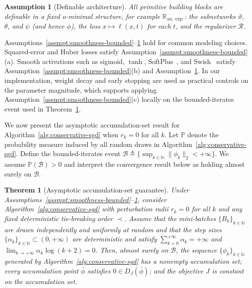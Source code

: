 \documentclass[11pt, letterpaper, oneside, reqno]{amsart}
\newcommand{\Let}{\triangleq}
\newtheorem{theorem}{Theorem}
\newtheorem{assumption}{Assumption}
\begin{document}
\begin{assumption}[Definable architecture]
\label{assmpt:definable}
All primitive building blocks are definable in a fixed o-minimal structure, for example $\mathbb R_{\mathrm{an},\exp}$: the subnetworks $\vartheta$, $\theta$, and $\psi$ (and hence $\phi$), the loss $x \mapsto \ell(x, t)$ for each $t$, and the regularizer $\mathcal R$.
\end{assumption}

Assumptions~\ref{assmpt:smoothness-bounded}--\ref{assmpt:definable} hold for common modeling choices. Squared-error and Huber losses satisfy Assumption~\ref{assmpt:smoothness-bounded}(a). Smooth activations such as sigmoid, $\tanh$, SoftPlus~\cite{ref:dugas2000incorporating}, and Swish~\cite{ref:ramachandran2017searching} satisfy Assumption~\ref{assmpt:smoothness-bounded}(b) and Assumption~\ref{assmpt:definable}. In our implementation, weight decay and early stopping are used as practical controls on the parameter magnitude, which supports applying Assumption~\ref{assmpt:smoothness-bounded}(c) locally on the bounded-iterates event used in Theorem~\ref{thm:convergence}.

We now present the asymptotic accumulation-set result for Algorithm~\ref{alg:conservative-sgd} when $r_k=0$ for all $k$. Let $\mathbb P$ denote the probability measure induced by all random draws in Algorithm~\ref{alg:conservative-sgd}. Define the bounded-iterates event $\mathcal B \Let \{\sup_{k\in\mathbb N}\|\phi_k\|_2<+\infty \}$. We assume $\mathbb{P}(\mathcal B)>0$ and interpret the convergence result below as holding almost surely on $\mathcal B$.

\begin{theorem}[Asymptotic accumulation-set guarantee]
\label{thm:convergence}
Under Assumptions~\ref{assmpt:smoothness-bounded}--\ref{assmpt:definable}, consider Algorithm~\ref{alg:conservative-sgd} with perturbation radii $r_k=0$ for all $k$ and any fixed deterministic tie-breaking order $\prec$. Assume that the mini-batches $\{B_k\}_{k\in\mathbb N}$ are drawn independently and uniformly at random and that the step sizes $\{\alpha_k\}_{k\in\mathbb N}\subset(0, +\infty)$ are deterministic and satisfy $\sum_{k=0}^{+\infty}\alpha_k = +\infty$ and $\lim_{k\to+\infty}\alpha_k\log(k+2)=0$.
Then, almost surely on $\mathcal B$, the sequence $\{\phi_k\}_{k\in\mathbb N}$ generated by Algorithm~\ref{alg:conservative-sgd} has a nonempty accumulation set; every accumulation point $\bar\phi$ satisfies $0\in D_J(\bar\phi)$; and the objective $J$ is constant on the accumulation set.
\end{theorem}
\end{document}
